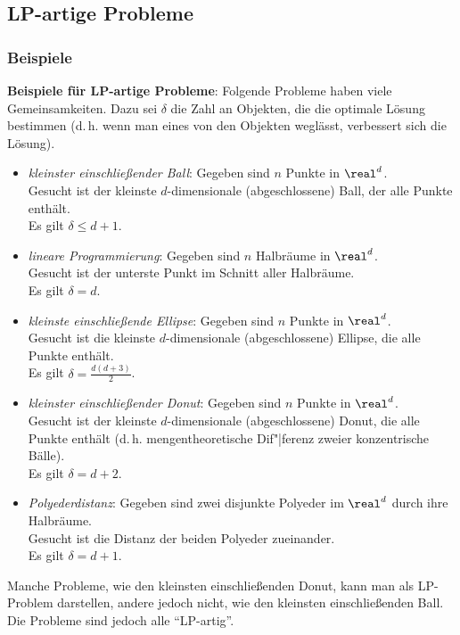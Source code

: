 \pagebreak

\subsection{%
    LP-artige Probleme%
}

\subsubsection{%
    Beispiele%
}

\textbf{Beispiele für LP-artige Probleme}:
Folgende Probleme haben viele Gemeinsamkeiten.
Dazu sei $\delta$ die Zahl an Objekten, die die optimale Lösung bestimmen
(d.\,h. wenn man eines von den Objekten weglässt, verbessert sich die Lösung).
\begin{itemize}
    \item
    \emph{kleinster einschließender Ball}:
    Gegeben sind $n$ Punkte in $\real^d$.\\
    Gesucht ist der kleinste $d$-dimensionale (abgeschlossene) Ball, der alle Punkte enthält.\\
    Es gilt $\delta \le d + 1$.
    
    \item
    \emph{lineare Programmierung}:
    Gegeben sind $n$ Halbräume in $\real^d$.\\
    Gesucht ist der unterste Punkt im Schnitt aller Halbräume.\\
    Es gilt $\delta = d$.
    
    \item
    \emph{kleinste einschließende Ellipse}:
    Gegeben sind $n$ Punkte in $\real^d$.\\
    Gesucht ist die kleinste $d$-dimensionale (abgeschlossene) Ellipse, die alle Punkte enthält.\\
    Es gilt $\delta = \frac{d(d+3)}{2}$.
    
    \item
    \emph{kleinster einschließender Donut}:
    Gegeben sind $n$ Punkte in $\real^d$.\\
    Gesucht ist der kleinste $d$-dimensionale (abgeschlossene) Donut, die alle Punkte enthält
    (d.\,h. mengentheoretische Dif"|ferenz zweier konzentrische Bälle).\\
    Es gilt $\delta = d + 2$.
    
    \item
    \emph{Polyederdistanz}:
    Gegeben sind zwei disjunkte Polyeder im $\real^d$ durch ihre Halbräume.\\
    Gesucht ist die Distanz der beiden Polyeder zueinander.\\
    Es gilt $\delta = d + 1$.
\end{itemize}
Manche Probleme, wie den kleinsten einschließenden Donut, kann man als LP-Problem darstellen,
andere jedoch nicht, wie den kleinsten einschließenden Ball.
Die Probleme sind jedoch alle "`LP-artig"'.

